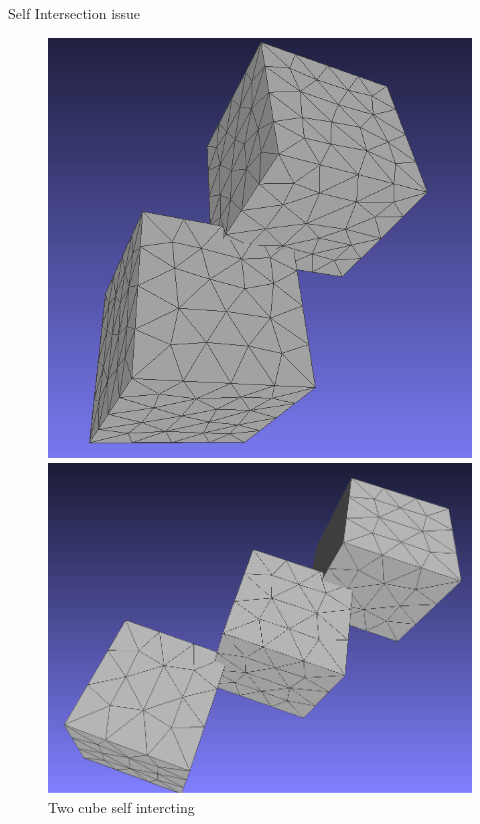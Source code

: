 \documentclass[10pt]{beamer}
\begin{document}
\begin{frame}{Self Intersection issue}
    \begin{figure}
        \centering
        \begin{minipage}[b]{0.23\textwidth}
          \centering
          \includegraphics[width=\textwidth]{../image/2cubes.png}
          \caption{Two cube self intercting}
        \end{minipage}\hfill
        \begin{minipage}[b]{0.23\textwidth}
          \centering
          \includegraphics[width=\textwidth]{../image/3cubes.png}

\end{minipage}
\end{figure}
\end{frame}
\end{document}
